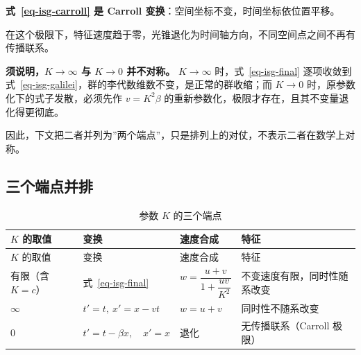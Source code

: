 \documentclass[
  chinese,
  a4paper,
  UTF8,
  12pt,
  oneside,
  openany]{ctexbook}
\theoremstyle{plain}
\theoremstyle{plain}
\theoremstyle{plain}
\theoremstyle{definition}
\theoremstyle{plain}
\theoremstyle{plain}
\theoremstyle{remark}
\begin{document}
\textbf{式~\ref{eq-isg-carroll} 是 Carroll
变换}：空间坐标不变，时间坐标依位置平移。

在这个极限下，特征速度趋于零，光锥退化为时间轴方向，不同空间点之间不再有传播联系。

\textbf{须说明，\(K\to\infty\) 与 \(K\to0\) 并不对称。} \(K\to\infty\)
时，式~\ref{eq-isg-final} 逐项收敛到
式~\ref{eq-isg-galilei}，群的李代数维数不变，是正常的群收缩；而
\(K\to0\) 时，原参数化下的式子发散，必须先作 \(v=K^{2}\beta\)
的重新参数化，极限才存在，且其不变量退化得更彻底。

因此，下文把二者并列为''两个端点''，只是排列上的对仗，不表示二者在数学上对称。

\subsection{三个端点并排}\label{ux4e09ux4e2aux7aefux70b9ux5e76ux6392}

\begin{longtable}[]{@{}
  >{\raggedright\arraybackslash}p{}
  >{\raggedright\arraybackslash}p{}
  >{\raggedright\arraybackslash}p{}
  >{\raggedright\arraybackslash}p{}@{}}
\caption{参数 \(K\) 的三个端点}\label{tbl-isg-ends}\tabularnewline
\toprule\noalign{}
\begin{minipage}[b]{\linewidth}\raggedright
\(K\) 的取值
\end{minipage} & \begin{minipage}[b]{\linewidth}\raggedright
变换
\end{minipage} & \begin{minipage}[b]{\linewidth}\raggedright
速度合成
\end{minipage} & \begin{minipage}[b]{\linewidth}\raggedright
特征
\end{minipage} \\
\midrule\noalign{}
\endfirsthead
\toprule\noalign{}
\begin{minipage}[b]{\linewidth}\raggedright
\(K\) 的取值
\end{minipage} & \begin{minipage}[b]{\linewidth}\raggedright
变换
\end{minipage} & \begin{minipage}[b]{\linewidth}\raggedright
速度合成
\end{minipage} & \begin{minipage}[b]{\linewidth}\raggedright
特征
\end{minipage} \\
\midrule\noalign{}
\endhead
\bottomrule\noalign{}
\endlastfoot
有限（含 \(K=c\)） & 式~\ref{eq-isg-final} &
\(w=\dfrac{u+v}{1+\dfrac{uv}{K^{2}}}\) & 不变速度有限，同时性随系改变 \\
\(\infty\) & \(t'=t,\ x'=x-vt\) & \(w=u+v\) & 同时性不随系改变 \\
\(0\) & \(t'=t-\beta x,\quad x'=x\) & 退化 & 无传播联系（Carroll
极限） \\
\end{longtable}
\end{document}
